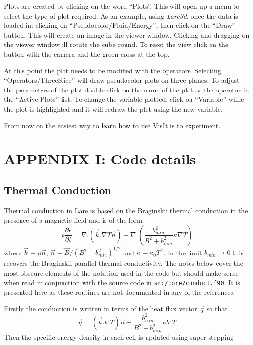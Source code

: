 \documentclass[11pt]{article}
\begin{document}
Plots are created by clicking on the word ``Plots''. This will open up a menu to select the type of plot required. 
As an example, using {\it Lare3d}, once the data is loaded in: clicking on ``Pseudocolor/Fluid/Energy'', then click 
on the ``Draw'' button. This will create an image in the viewer window. Clicking and dragging on the viewer window 
ill rotate the cube round. To reset the view click on the button  with the camera and the green cross at the top.

At this point the plot needs to be modified with the operators. Selecting ``Operators/ThreeSlice'' will draw 
pseudocolor plots on three planes. To adjust the parameters of the plot double click on the name of the plot 
or the operator in the ``Active Plots'' list. To change the variable plotted, click on ``Variable'' while the plot 
is highlighted and it will redraw the plot using the new variable.

From now on the easiest way to learn how to use VisIt is to experiment.

\newpage
\section*{ APPENDIX I: Code details}
\subsection*{Thermal Conduction} %
\label{sec:thermal_code}

Thermal conduction in Lare is based on the Braginskii thermal conduction in the presence of a magnetic field and is of the form\\
\[
\rho \frac{\partial \epsilon}{\partial t} = \nabla . \left(\vec{k} . \nabla T \vec{n} \right) +  
\nabla . \left(  \frac{b_{min}^2}{B^2+b_{min}^2} \kappa \nabla T \right)
\]
where $\vec{k} = \kappa \vec{n}$, $\vec{n} = \vec{B}/(B^2+b_{min}^2)^{1/2}$ and $\kappa = \kappa_0  T^\frac{5}{2}$. 
In the limit $b_{min}\to 0$ this recovers the Braginskii parallel thermal conductivity. The notes below cover the 
most obscure elements of the notation used in the code but should make sense when read in conjunction with the 
source code in {\tt src/core/conduct.f90}. It is presented here as these routines are not documented in any of the references.

Firstly the conduction is written in terms of the heat flux vector $\vec{q}$ so that
\[
\vec{q}= \left(\vec{k} . \nabla T \right) \vec{n} +    \frac{b_{min}^2}{B^2+b_{min}^2} \kappa \nabla T
\]
Then the specific energy density in each cell is updated using super-stepping \cite{Meyer:2012eb}
\end{document}
